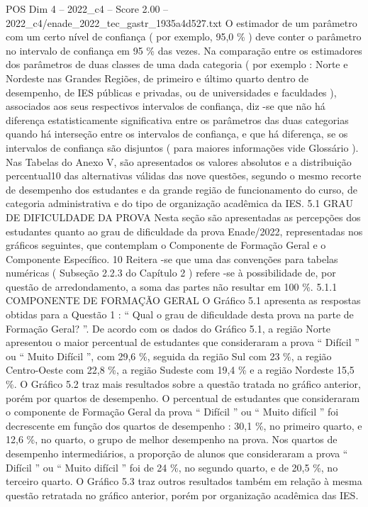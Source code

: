 \begin{textsample}{POS Dim 4 – 2022\_c4 – Score 2.00 – 2022\_c4/enade\_2022\_tec\_gastr\_1935a4d527.txt}
O estimador de um parâmetro com um certo nível de confiança ( por exemplo, 95,0 \% ) deve conter o parâmetro no intervalo de confiança em 95 \% das vezes.
Na comparação entre os estimadores dos parâmetros de duas classes de uma dada categoria ( por exemplo : Norte e Nordeste nas Grandes Regiões, de primeiro e último quarto dentro de desempenho, de IES públicas e privadas, ou de universidades e faculdades ), associados aos seus respectivos intervalos de confiança, diz -se que não há diferença estatisticamente significativa entre os parâmetros das duas categorias quando há interseção entre os intervalos de confiança, e que há diferença, se os intervalos de confiança são disjuntos ( para maiores informações vide Glossário ).
Nas Tabelas do Anexo V, são apresentados os valores absolutos e a distribuição percentual10 das alternativas válidas das nove questões, segundo o mesmo recorte de desempenho dos estudantes e da grande região de funcionamento do curso, de categoria administrativa e do tipo de organização acadêmica da IES. 5.1 GRAU DE DIFICULDADE DA PROVA Nesta seção são apresentadas as percepções dos estudantes quanto ao grau de dificuldade da prova Enade/2022, representadas nos gráficos seguintes, que contemplam o Componente de Formação Geral e o Componente Específico. 10 Reitera -se que uma das convenções para tabelas numéricas ( Subseção 2.2.3 do Capítulo 2 ) refere -se à possibilidade de, por questão de arredondamento, a soma das partes não resultar em 100 \%. 5.1.1 COMPONENTE DE FORMAÇÃO GERAL O Gráfico 5.1 apresenta as respostas obtidas para a Questão 1 : “ Qual o grau de dificuldade desta prova na parte de Formação Geral? ”.
De acordo com os dados do Gráfico 5.1, a região Norte apresentou o maior percentual de estudantes que consideraram a prova “ Difícil ” ou “ Muito Difícil ”, com 29,6 \%, seguida da região Sul com 23 \%, a região Centro-Oeste com 22,8 \%, a região Sudeste com 19,4 \% e a região Nordeste 15,5 \%.
O Gráfico 5.2 traz mais resultados sobre a questão tratada no gráfico anterior, porém por quartos de desempenho.
O percentual de estudantes que consideraram o componente de Formação Geral da prova “ Difícil ” ou “ Muito difícil ” foi decrescente em função dos quartos de desempenho : 30,1 \%, no primeiro quarto, e 12,6 \%, no quarto, o grupo de melhor desempenho na prova.
Nos quartos de desempenho intermediários, a proporção de alunos que consideraram a prova “ Difícil ” ou “ Muito difícil ” foi de 24 \%, no segundo quarto, e de 20,5 \%, no terceiro quarto.
O Gráfico 5.3 traz outros resultados também em relação à mesma questão retratada no gráfico anterior, porém por organização acadêmica das IES.

\end{textsample}
